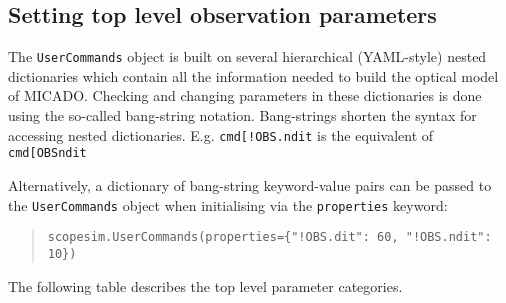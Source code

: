 

\subsection{Setting top level observation parameters%
  \label{setting-top-level-observation-parameters}%
}

The \texttt{UserCommands} object is built on several hierarchical (YAML-style) nested dictionaries which contain all the information needed to build the optical model of MICADO.
Checking and changing parameters in these dictionaries is done using the so-called \textquotedbl{}bang-string\textquotedbl{} notation.
Bang-strings shorten the syntax for accessing nested dictionaries.
E.g. \texttt{cmd{[}\textquotedbl{}!OBS.ndit\textquotedbl{}{]}} is the equivalent of \texttt{cmd{[}\textquotedbl{}OBS\textquotedbl{}{]}{[}\textquotedbl{}ndit\textquotedbl{}{]}}

Alternatively, a dictionary of bang-string keyword-value pairs can be passed to the \texttt{UserCommands} object when initialising via the \texttt{properties} keyword:

\begin{quote}
\begin{alltt}
\begin{lstlisting}[frame=single]
scopesim.UserCommands(properties={"!OBS.dit": 60, "!OBS.ndit": 10})
\end{lstlisting}
\end{alltt}
\end{quote}

The following table describes the top level parameter categories.

